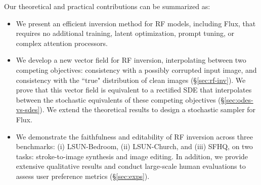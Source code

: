 \documentclass{article} %
\theoremstyle{plain}
\begin{document}
Our theoretical and practical contributions can be summarized as:
\vspace{-1.5ex}
\begin{itemize}[left=3pt, noitemsep]
    \item We present an efficient inversion method for RF models, including Flux, that requires no additional training, latent  optimization, prompt tuning, or complex attention processors.
    
    \item We develop a new vector field for RF inversion, interpolating between two competing objectives: consistency with a possibly corrupted input image, and consistency with the ``true" distribution of clean images (\S\ref{sec:rf-inv}).
    We prove that this vector field is equivalent to a rectified SDE that interpolates between the stochastic equivalents of these competing objectives (\S\ref{sec:odes-vs-sdes}).
    We extend the theoretical results to design a stochastic sampler for Flux.
    
    \item We demonstrate the faithfulness and editability of RF inversion across three benchmarks: (i) LSUN-Bedroom, (ii) LSUN-Church, and (iii) SFHQ, on two tasks: stroke-to-image synthesis and image editing. 
    In addition, we provide extensive qualitative results and conduct large-scale human evaluations to assess user preference metrics (\S\ref{sec:exps}).
\end{itemize}
\end{document}
